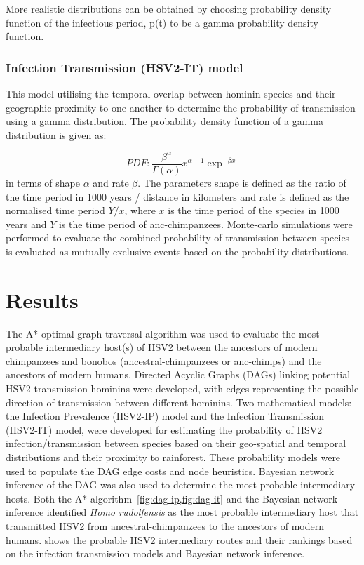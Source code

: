 \documentclass[fleqn,10pt]{wlscirep}
\begin{document}
More realistic distributions can be obtained by choosing  probability density function of the infectious period,  p(t) to be a gamma probability density function\cite{Blythe1988,Lloyd2001}.

\subsubsection*{Infection Transmission (HSV2-IT) model}
This model utilising the temporal overlap between hominin species and their geographic proximity to one another to determine the probability of transmission using a gamma distribution. The probability density function of a gamma distribution is given as:

\begin{equation}
PDF:\frac{\beta^\alpha}{\Gamma(\alpha)}x^{\alpha - 1} \exp^{-\beta x}
\end{equation}
in terms of shape $\alpha$ and rate $\beta$. The parameters shape is defined as the ratio of the time period in 1000 years / distance in kilometers and  rate  is defined as the normalised time period $Y / x$, where $x$ is the time period of the species in 1000 years and $Y$ is the time period of anc-chimpanzees. Monte-carlo simulations were performed to evaluate the combined probability of transmission between species is evaluated as mutually exclusive events based on the probability distributions. 

\section*{Results}

The A* optimal graph traversal algorithm was used to evaluate the most probable intermediary host(s) of HSV2 between the ancestors of modern chimpanzees and bonobos (ancestral-chimpanzees or anc-chimps) and the ancestors of modern humans. Directed Acyclic Graphs (DAGs) linking potential HSV2 transmission hominins were developed, with edges representing the possible direction of transmission between different hominins. Two mathematical models: the Infection Prevalence (HSV2-IP) model and the Infection Transmission (HSV2-IT) model, were developed for estimating the probability of HSV2 infection/transmission between species based on their geo-spatial and temporal distributions and their proximity to rainforest. These probability models were used to populate the DAG edge costs and node heuristics. Bayesian network inference of the DAG was also used to determine the most probable intermediary hosts. Both the A* algorithm~\cref{fig:dag-ip,fig:dag-it} and the Bayesian network inference identified \textit{Homo rudolfensis} as the most probable intermediary host that transmitted HSV2 from ancestral-chimpanzees to the ancestors of modern humans.  shows the probable HSV2 intermediary routes and their rankings based on the infection transmission models and Bayesian network inference.
\end{document}
